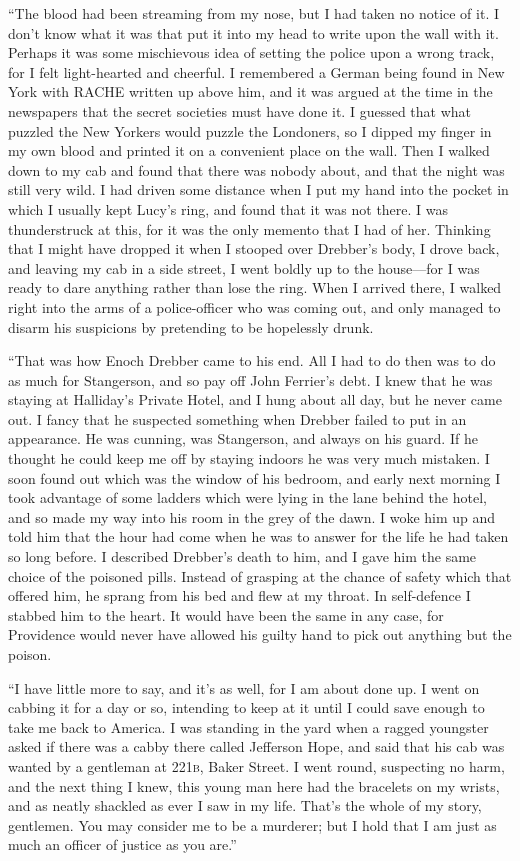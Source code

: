 \documentclass[12pt,english,oneside]{book}
\newcommand{\noun}[1]{\textsc{#1}}
\newcommand{\mdsh}[1]{\mbox{#1}\linebreak[1]}
\begin{document}
{}``The blood had been streaming from my nose, but I had taken no
notice of it. I don't know what it was that put it into my head to
write upon the wall with it. Perhaps it was some mischievous idea
of setting the police upon a wrong track, for I felt light-hearted
and cheerful. I remembered a German being found in New York with RACHE
written up above him, and it was argued at the time in the newspapers
that the secret societies must have done it. I guessed that what puzzled
the New Yorkers would puzzle the Londoners, so I dipped my finger
in my own blood and printed it on a convenient place on the wall.
Then I walked down to my cab and found that there was nobody about,
and that the night was still very wild. I had driven some distance
when I put my hand into the pocket in which I usually kept Lucy's
ring, and found that it was not there. I was thunderstruck at this,
for it was the only memento that I had of her. Thinking that I might
have dropped it when I stooped over Drebber's body, I drove back,
and leaving my cab in a side street, I went boldly up to the house\mdsh{---}for
I was ready to dare anything rather than lose the ring. When I arrived
there, I walked right into the arms of a police-officer who was coming
out, and only managed to disarm his suspicions by pretending to be
hopelessly drunk.

{}``That was how Enoch Drebber came to his end. All I had to do then
was to do as much for Stangerson, and so pay off John Ferrier's debt.
I knew that he was staying at Halliday's Private Hotel, and I hung
about all day, but he never came out. I fancy that he suspected something
when Drebber failed to put in an appearance. He was cunning, was Stangerson,
and always on his guard. If he thought he could keep me off by staying
indoors he was very much mistaken. I soon found out which was the
window of his bedroom, and early next morning I took advantage of
some ladders which were lying in the lane behind the hotel, and so
made my way into his room in the grey of the dawn. I woke him up and
told him that the hour had come when he was to answer for the life
he had taken so long before. I described Drebber's death to him, and
I gave him the same choice of the poisoned pills. Instead of grasping
at the chance of safety which that offered him, he sprang from his
bed and flew at my throat. In self-defence I stabbed him to the heart.
It would have been the same in any case, for Providence would never
have allowed his guilty hand to pick out anything but the poison.

{}``I have little more to say, and it's as well, for I am about done
up. I went on cabbing it for a day or so, intending to keep at it
until I could save enough to take me back to America. I was standing
in the yard when a ragged youngster asked if there was a cabby there
called Jefferson Hope, and said that his cab was wanted by a gentleman
at \noun{221b}, Baker Street. I went round, suspecting no harm,
and the next thing I knew, this young man here had the bracelets on
my wrists, and as neatly shackled as ever I saw in my life. That's
the whole of my story, gentlemen. You may consider me to be a murderer;
but I hold that I am just as much an officer of justice as you are.''
\end{document}
